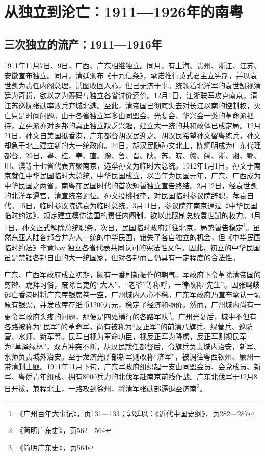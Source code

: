 \chapter{从独立到沦亡：1911—1926年的南粤}

\section{三次独立的流产：1911—1916年}

\indent 1911年11月7日、9日，广西、广东相继独立。同月，有上海、贵州、浙江、江苏、安徽宣布独立。同月，清廷颁布《十九信条》，承诺推行英式君主立宪制，并以袁世凯为责任内阁总理，试图收回人心，但已无济于事。统领着北洋军的袁世凯视清廷为奇货，欲以之为筹码与独立各省讨价还价。12月1日，江浙联军攻克南京，清江苏巡抚张勋率败兵弃城北逃。至此，清帝国已彻底失去对长江以南的控制权，灭亡只是时间问题。由于各省独立军多由同盟会、光复会、华兴会一类的革命派把持，立宪派亦对乡邦的真正独立缺乏兴趣，建立大一统的共和政体已成定局。12月21日，孙文自美国抵香港，广东都督胡汉民迎之。胡汉民希望孙文留粤练兵，孙文却急于北上建立新的大一统政府。24日，胡汉民随孙文北上，陈炯明成为广东代理都督。29日，粤、桂、奉、直、豫、鲁、晋、陕、苏、皖、赣、闽、浙、湘、鄂、川、滇等十七省代表齐聚南京，选举孙文为临时大总统。1912年1月1日，孙文于南京就任中华民国临时大总统，中华民国成立，以当年为民国元年，广东、广西成为中华民国之两省，南粤在民国时代的首次短暂独立宣告终结。2月12日，经袁世凯的北洋军逼宫，清宣统帝逊位。孙文投桃报李，对民国临时参议院辞职，荐袁自代。15日，临时参议院选袁为临时总统。3月11日，参议院在南京通过《中华民国临时约法》，规定建立模仿法国的责任内阁制，欲以此限制总统袁世凯的权力。4月1日，孙文正式解除总统职务。次日，民国临时政府迁往北京，局势暂告稳定\footnote{《广州百年大事记》，页131—133；郭廷以：《近代中国史纲》，页282—287}。虽然东亚大陆各邦合并为大一统的中华民国，错失了各自独立的机会，但《中华民国临时约法》毕竟hay 独立各省代表共同认可的宪法性文件。因此，初立的中华民国虽是禁锢各邦自由的大一统国家，但对各邦而言仍具有一定程度的合法性。

广东、广西军政府成立初期，颇有一番刷新振作的朝气。军政府下令革除清帝国的剪辫、跪拜习俗，废除官吏的“大人”、“老爷”等称呼，一律改称“先生”。因张鸣歧逃亡香港时将广东库银席卷一空，广州城内人心不稳。广东军政府乃宣布承认一切原有银票，并发放库存纸币1200万元，稳定了经济和物价。然而，广州城内尚有一更令军政府头疼的问题，那便是四处横行的各路军队\footnote{《简明广东史》，页562—564}。广州光复后，城中不但有各路被称为“民军”的革命军，尚有被称为“反正军”的前清八旗兵、绿营兵、巡防营、水师、新军等。民军自视为革命功臣，视反正军为降虏，反正军则视民军为“草泽绿林”，双方冲突不断。胡汉民就任都督后，令旗兵负责城内治安，新军、水师负责城外治安。至于龙济光所部新军则改称“济军”，被调往粤西钦州、廉州一带清剿土匪。1911年11月下旬，广东军政府组织起一支由同盟会员、会党成员、新军、粤侨青年组成、拥有8000兵力的北伐军赴南京前线作战。广东北伐军于12月8日开拔，兼程北上，一路攻到徐州，将清军张勋部逼退至济南\footnote{《简明广东史》，页564}。

